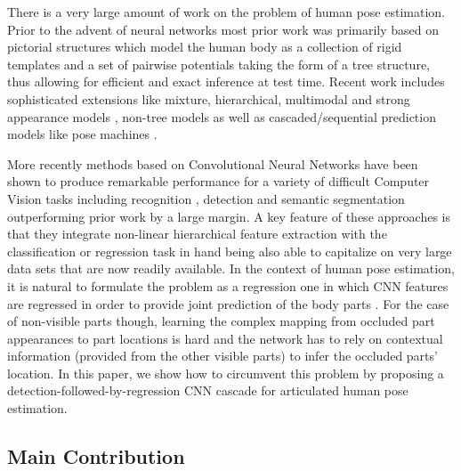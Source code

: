 \documentclass[runningheads]{llncs}
\begin{document}
There is a very large amount of work on the problem of human pose estimation. Prior to the advent of neural networks most prior work was primarily based on pictorial structures \cite{felzenszwalb2005pictorial} which model the human body as a collection of rigid templates and a set of pairwise potentials taking the form of a tree structure, thus allowing for efficient and exact inference at test time. Recent work includes sophisticated extensions like mixture, hierarchical, multimodal and strong appearance models \cite{yang2011articulated, pishchulin2013poselet, tian2012exploring, sapp2013modec, pishchulin2013strong}, non-tree models \cite{karlinsky2012using, dantone2013human} as well as cascaded/sequential prediction models like pose machines \cite{ramakrishna2014pose}.

More recently methods based on Convolutional Neural Networks have been shown to produce remarkable performance for a variety of difficult Computer Vision tasks including recognition \cite{he2016deep, simonyan2014very}, detection \cite{girshick2015fast} and semantic segmentation \cite{long2015fully} outperforming prior work by a large margin. A key feature of these approaches is that they integrate non-linear hierarchical feature extraction with the classification or regression task in hand being also able to capitalize on very large data sets that are now readily available. In the context of human pose estimation, it is natural to formulate the problem as a regression one in which CNN features are regressed in order to provide joint prediction of the body parts \cite{toshev2014deeppose, pfister2014deep, pfister2015flowing, belagiannis2015robust}. For the case of non-visible parts though, learning the complex mapping from occluded part appearances to part locations is hard and the network has to rely on contextual information (provided from the other visible parts) to infer the occluded parts' location. In this paper, we show how to circumvent this problem by proposing a detection-followed-by-regression CNN cascade for articulated human pose estimation. 

\subsection{Main Contribution}
\end{document}
